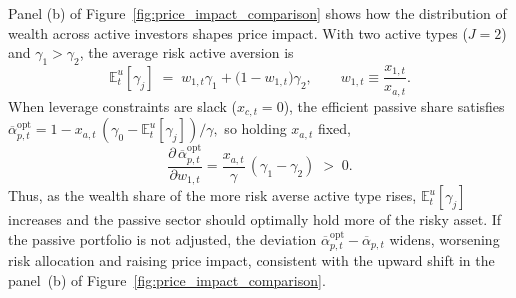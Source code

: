 Panel (b) of Figure~\ref{fig:price_impact_comparison} shows how the distribution of wealth across active investors shapes price impact. With two active types ($J=2$) and $\gamma_1>\gamma_2$, the average risk active aversion is
\[
\mathbb{E}^u_t[\gamma_j] \;=\; w_{1,t}\gamma_1 + \bigl(1-w_{1,t}\bigr)\gamma_2,
\qquad
w_{1,t}\equiv \frac{x_{1,t}}{x_{a,t}}.
\]
When leverage constraints are slack ($x_{c,t}=0$), the efficient passive share satisfies
\(
\overline{\alpha}_{p,t}^{\mathrm{opt}}
= 1 - x_{a,t}\,(\gamma_0-\mathbb{E}^u_t[\gamma_j])/\gamma,
\)
so holding $x_{a,t}$ fixed,
\[
\frac{\partial\,\overline{\alpha}_{p,t}^{\mathrm{opt}}}{\partial w_{1,t}}
= \frac{x_{a,t}}{\gamma}\,(\gamma_1-\gamma_2) \;>\; 0.
\]
Thus, as the wealth share of the more risk averse active type rises, $\mathbb{E}^u_t[\gamma_j]$ increases and the passive sector should optimally hold more of the risky asset. If the passive portfolio is not adjusted, the deviation $\overline{\alpha}_{p,t}^{\mathrm{opt}}-\overline{\alpha}_{p,t}$ widens, worsening risk allocation and raising price impact, consistent with the upward shift in the panel~(b) of Figure~\ref{fig:price_impact_comparison}.


